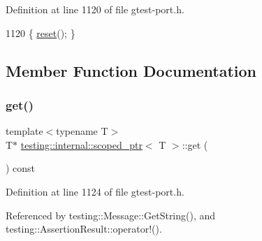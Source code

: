 Definition at line 1120 of file gtest-\/port.\+h.


\begin{DoxyCode}
1120 \{ \hyperlink{classtesting_1_1internal_1_1scoped__ptr_acac03266a43359801aff0de5c990bec0}{reset}(); \}
\end{DoxyCode}


\subsection{Member Function Documentation}
\mbox{\label{classtesting_1_1internal_1_1scoped__ptr_aa5984291e12453f1e81b7676d1fa26fd}} 
\subsubsection{\texorpdfstring{get()}{get()}}
{\footnotesize\ttfamily template$<$typename T$>$ \\
T$\ast$ \hyperlink{classtesting_1_1internal_1_1scoped__ptr}{testing\+::internal\+::scoped\+\_\+ptr}$<$ T $>$\+::get (\begin{DoxyParamCaption}{ }\end{DoxyParamCaption}) const\hspace{0.3cm}{\ttfamily [inline]}}



Definition at line 1124 of file gtest-\/port.\+h.



Referenced by testing\+::\+Message\+::\+Get\+String(), and testing\+::\+Assertion\+Result\+::operator!().


